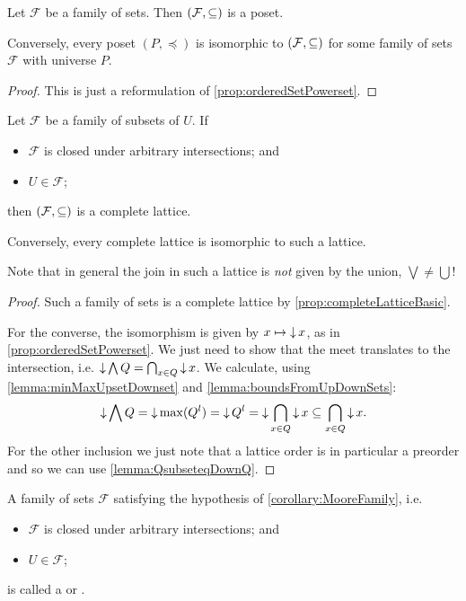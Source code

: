 \begin{proposition} \label{prop:posetPowerset}
Let $\mathcal{F}$ be a family of sets. Then $\left( \mathcal{F}, \subseteq \right)$ is a poset.

Conversely, every poset $(P,\preceq)$ is isomorphic to $\left( \mathcal{F}, \subseteq \right)$ for some family of sets $\mathcal{F}$ with universe $P$.
\end{proposition}
\begin{proof}
This is just a reformulation of \ref{prop:orderedSetPowerset}.
\end{proof}
\begin{corollary} \label{corollary:MooreFamily}
Let $\mathcal{F}$ be a family of subsets of $U$. If
\begin{itemize}
\item $\mathcal{F}$ is closed under arbitrary intersections; and
\item $U \in \mathcal{F}$;
\end{itemize}
then $\left( \mathcal{F},\subseteq \right)$ is a complete lattice.

Conversely, every complete lattice is isomorphic to such a lattice.
\end{corollary}
Note that in general the join in such a lattice is \emph{not} given by the union, $\bigvee \neq \bigcup$!
\begin{proof}
Such a family of sets is a complete lattice by \ref{prop:completeLatticeBasic}.

For the converse, the isomorphism is given by $x\mapsto \mathop{\downarrow} x$, as in \ref{prop:orderedSetPowerset}. We just need to show that the meet translates to the intersection, i.e. $\mathop{\downarrow} \bigwedge Q = \bigcap_{x\in Q}\mathop{\downarrow} x$. We calculate, using \ref{lemma:minMaxUpsetDownset} and \ref{lemma:boundsFromUpDownSets}:
\[ \mathop{\downarrow} \bigwedge Q = \mathop{\downarrow} \max(Q^l) = \mathop{\downarrow} Q^l = \mathop{\downarrow} \bigcap_{x\in Q} \mathop{\downarrow} x \subseteq \bigcap_{x\in Q} \mathop{\downarrow} x. \]
For the other inclusion we just note that a lattice order is in particular a  preorder and so we can use \ref{lemma:QsubseteqDownQ}.
\end{proof}

\begin{definition}
A family of sets $\mathcal{F}$ satisfying the hypothesis of \ref{corollary:MooreFamily}, i.e.
\begin{itemize}
\item $\mathcal{F}$ is closed under arbitrary intersections; and
\item $U \in \mathcal{F}$;
\end{itemize}
is called a  or .
\end{definition}

